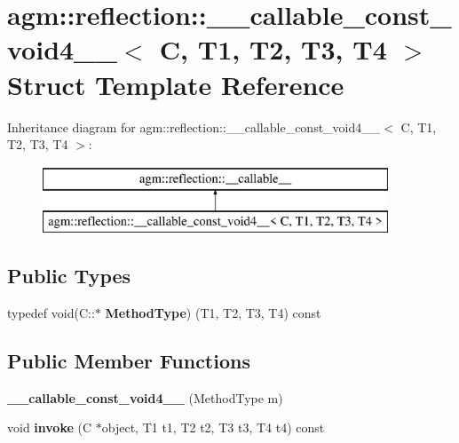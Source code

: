 \hypertarget{structagm_1_1reflection_1_1____callable__const__void4____}{}\section{agm\+:\+:reflection\+:\+:\+\_\+\+\_\+callable\+\_\+const\+\_\+void4\+\_\+\+\_\+$<$ C, T1, T2, T3, T4 $>$ Struct Template Reference}
\label{structagm_1_1reflection_1_1____callable__const__void4____}
Inheritance diagram for agm\+:\+:reflection\+:\+:\+\_\+\+\_\+callable\+\_\+const\+\_\+void4\+\_\+\+\_\+$<$ C, T1, T2, T3, T4 $>$\+:\begin{figure}[H]
\begin{center}
\leavevmode
\includegraphics[height=2.000000cm]{structagm_1_1reflection_1_1____callable__const__void4____}
\end{center}
\end{figure}
\subsection*{Public Types}
\begin{DoxyCompactItemize}
\item 
typedef void(C\+::$\ast$ {\bfseries Method\+Type}) (T1, T2, T3, T4) const \hypertarget{structagm_1_1reflection_1_1____callable__const__void4_____a825d98744a25e01d05487746ee22665e}{}\label{structagm_1_1reflection_1_1____callable__const__void4_____a825d98744a25e01d05487746ee22665e}

\end{DoxyCompactItemize}
\subsection*{Public Member Functions}
\begin{DoxyCompactItemize}
\item 
{\bfseries \+\_\+\+\_\+callable\+\_\+const\+\_\+void4\+\_\+\+\_\+} (Method\+Type m)\hypertarget{structagm_1_1reflection_1_1____callable__const__void4_____a36f94d36732beccefb311f5d847c002c}{}\label{structagm_1_1reflection_1_1____callable__const__void4_____a36f94d36732beccefb311f5d847c002c}

\item 
void {\bfseries invoke} (C $\ast$object, T1 t1, T2 t2, T3 t3, T4 t4) const \hypertarget{structagm_1_1reflection_1_1____callable__const__void4_____aea5c35a1a912ca0d73a4771f244209c3}{}\label{structagm_1_1reflection_1_1____callable__const__void4_____aea5c35a1a912ca0d73a4771f244209c3}

\end{DoxyCompactItemize}

